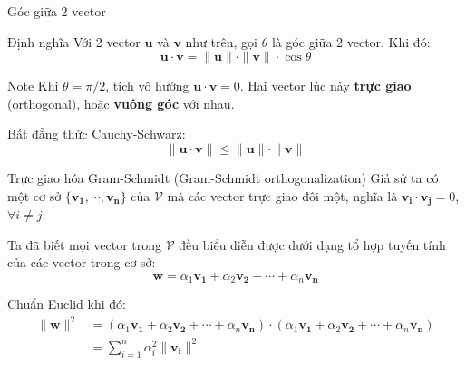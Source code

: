 \begin{frame}{Góc giữa 2 vector}
    \begin{block}{Định nghĩa}
         Với 2 vector $\bm{u}$ và $\bm{v}$ như trên, gọi $\theta$ là góc giữa 2 vector. Khi đó: \[\bm{u} \cdot \bm{v} = \|\bm{u}\| \cdot \|\bm{v}\| \cdot \cos \theta \]   
    \end{block}
    
    \begin{alertblock}{Note}
        Khi $\theta = \pi / 2$, tích vô hướng $\bm{u} \cdot \bm{v}
         = 0$. Hai vector lúc này \textbf{trực giao} (orthogonal), 
        hoặc \textbf{vuông góc} với nhau.
    
        Bất đẳng thức Cauchy-Schwarz: \[\|\bm{u} \cdot \bm{v}\| \leq \|\bm{u}\| \cdot \|\bm{v}\|\]
    \end{alertblock}
    
\end{frame}

\begin{frame}{Trực giao hóa Gram-Schmidt (Gram-Schmidt orthogonalization)}
    Giả sử ta có một cơ sở $\{\bm{v_1}, \cdots, \bm{v_n}\}$ của $\mathcal{V}$ mà các vector trực giao đôi một, nghĩa là $\bm{v_i} \cdot \bm{v_j} = 0$, $\forall i \neq j$.
    
    Ta đã biết mọi vector trong $\mathcal{V}$ đều biểu diễn được dưới dạng tổ hợp tuyến tính của các vector trong cơ sở: \[\bm{w} = \alpha_1 \bm{v_1} + \alpha_2 \bm{v_2} + \cdots + \alpha_n \bm{v_n}\]
    
    Chuẩn Euclid khi đó: \begin{align*}
        \| \bm{w} \| ^2 & = (\alpha_1 \bm{v_1} + \alpha_2 \bm{v_2} + \cdots + \alpha_n \bm{v_n}) \cdot (\alpha_1 \bm{v_1} + \alpha_2 \bm{v_2} + \cdots + \alpha_n \bm{v_n}) \\ & = \sum_{i=1}^{n}\alpha_i^2 \| \bm{v_i} \|^2 
    \end{align*}
\end{frame}

